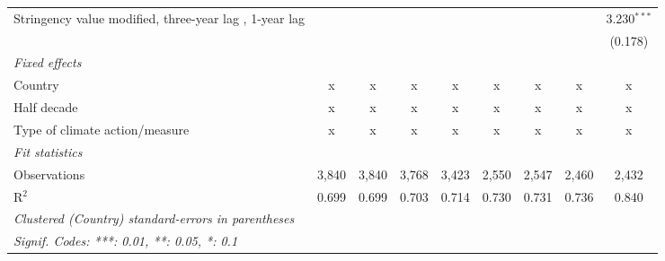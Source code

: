 \begin{table}[htbp]
\begin{tabular}{lcccccccc}
      Stringency value modified, three-year lag , 1-year lag                     &                &                &                &                &                &                &               & 3.230$^{***}$\\   
                                                                                 &                &                &                &                &                &                &               & (0.178)\\   
      \emph{Fixed effects}\\
      Country                                                                    & x              & x              & x              & x              & x              & x              & x             & x\\  
      Half decade                                                                & x              & x              & x              & x              & x              & x              & x             & x\\  
      Type of climate action/measure                                             & x              & x              & x              & x              & x              & x              & x             & x\\  
      \midrule \emph{Fit statistics}\\
      Observations                                                               & 3,840          & 3,840          & 3,768          & 3,423          & 2,550          & 2,547          & 2,460         & 2,432\\  
      R$^2$                                                                      & 0.699          & 0.699          & 0.703          & 0.714          & 0.730          & 0.731          & 0.736         & 0.840\\  
      \midrule
      \multicolumn{9}{l}{\emph{Clustered (Country) standard-errors in parentheses}}\\
      \multicolumn{9}{l}{\emph{Signif. Codes: ***: 0.01, **: 0.05, *: 0.1}}\\
   \end{tabular}
\end{table}


